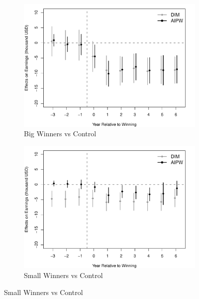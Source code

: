 \documentclass[letterpaper,12pt,leqno]{article}
\begin{document}
\begin{figure}[!ht]
    \caption{ATT Estimates: IRS Data, Trimmed Sample}\label{fig:irs.est2}
    \centering\vspace{-1em}
    \begin{minipage}[c]{1\textwidth}
        \centering
        \hspace{-2em}\begin{subfigure}{0.45\linewidth}
            \includegraphics[width=1\linewidth]{irs1_dyn.pdf}
            \caption{Big Winners vs Control}
        \end{subfigure}\hspace{1em}
        \begin{subfigure}{0.45\linewidth}
            \includegraphics[width=1\linewidth]{irs2_dyn.pdf}
            \caption{Small Winners vs Control}

\end{subfigure}
\end{minipage}
\end{figure}
\end{document}
